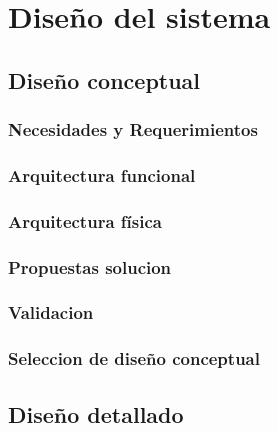 
\section{Diseño del sistema}


\subsection{Diseño conceptual}

\subsubsection{Necesidades y Requerimientos}

\subsubsection{Arquitectura funcional}

\subsubsection{Arquitectura física}

\subsubsection{Propuestas solucion}

\subsubsection{Validacion}

\subsubsection{Seleccion de diseño conceptual}


\subsection{Diseño detallado}



\newpage

